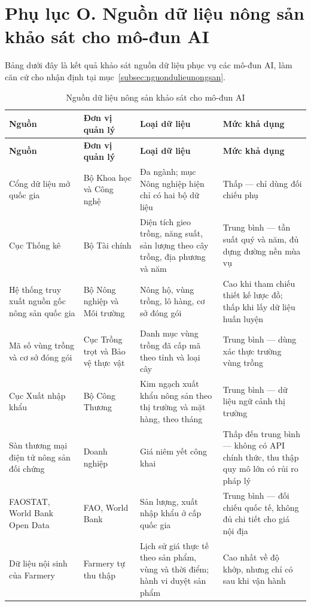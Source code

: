 \section*{Phụ lục O. Nguồn dữ liệu nông sản khảo sát cho mô-đun AI}
\label{apdx:nguondulieu}

Bảng dưới đây là kết quả khảo sát nguồn dữ liệu phục vụ các mô-đun AI, làm căn cứ cho nhận định tại mục~\ref{subsec:nguondulieunongsan}.

\begingroup
\small
\renewcommand{\arraystretch}{1.25}
\begin{longtable}{L{3.4cm} L{2.6cm} L{4.2cm} L{3.4cm}}
\caption{Nguồn dữ liệu nông sản khảo sát cho mô-đun AI}
\label{tab:nguondulieu} \\
\toprule
{}
\textbf{Nguồn} & \textbf{Đơn vị quản lý} & \textbf{Loại dữ liệu} & \textbf{Mức khả dụng} \\
\midrule
\endfirsthead
\toprule
{}
\textbf{Nguồn} & \textbf{Đơn vị quản lý} & \textbf{Loại dữ liệu} & \textbf{Mức khả dụng} \\
\midrule
\endhead
\bottomrule
\endfoot
Cổng dữ liệu mở quốc gia & Bộ Khoa học và Công nghệ & Đa ngành; mục Nông nghiệp hiện chỉ có hai bộ dữ liệu & Thấp --- chỉ dùng đối chiếu phụ \\
Cục Thống kê & Bộ Tài chính & Diện tích gieo trồng, năng suất, sản lượng theo cây trồng, địa phương và năm & Trung bình --- tần suất quý và năm, đủ dựng đường nền mùa vụ \\
Hệ thống truy xuất nguồn gốc nông sản quốc gia & Bộ Nông nghiệp và Môi trường & Nông hộ, vùng trồng, lô hàng, cơ sở đóng gói & Cao khi tham chiếu thiết kế lược đồ; thấp khi lấy dữ liệu huấn luyện \\
Mã số vùng trồng và cơ sở đóng gói & Cục Trồng trọt và Bảo vệ thực vật & Danh mục vùng trồng đã cấp mã theo tỉnh và loại cây & Trung bình --- dùng xác thực trường vùng trồng \\
Cục Xuất nhập khẩu & Bộ Công Thương & Kim ngạch xuất khẩu nông sản theo thị trường và mặt hàng, theo tháng & Trung bình --- dữ liệu ngữ cảnh thị trường \\
Sàn thương mại điện tử nông sản đối chứng & Doanh nghiệp & Giá niêm yết công khai & Thấp đến trung bình --- không có API chính thức, thu thập quy mô lớn có rủi ro pháp lý \\
FAOSTAT, World Bank Open Data & FAO, World Bank & Sản lượng, xuất nhập khẩu ở cấp quốc gia & Trung bình --- đối chiếu quốc tế, không đủ chi tiết cho giá nội địa \\
Dữ liệu nội sinh của Farmery & Farmery tự thu thập & Lịch sử giá thực tế theo sản phẩm, vùng và thời điểm; hành vi duyệt sản phẩm & Cao nhất về độ khớp, nhưng chỉ có sau khi vận hành \\
\end{longtable}
\endgroup
